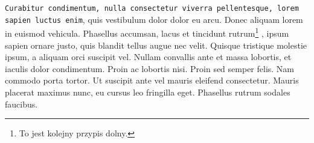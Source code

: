 \documentclass[12pt]{article}
\begin{document}
\texttt{Curabitur condimentum, nulla consectetur viverra pellentesque,
lorem sapien luctus enim}, quis vestibulum dolor dolor eu arcu. Donec
aliquam lorem in euismod vehicula. Phasellus accumsan, lacus et tincidunt
rutrum\footnote{To jest kolejny przypis dolny.}
, ipsum sapien ornare justo, quis blandit tellus augue nec velit. Quisque tristique molestie ipsum, a aliquam orci suscipit vel. Nullam convallis
ante et massa lobortis, et iaculis dolor condimentum. Proin ac lobortis nisi. Proin sed semper felis. Nam commodo porta tortor. Ut suscipit ante vel
mauris eleifend consectetur. Mauris placerat maximus nunc, eu cursus leo
fringilla eget. Phasellus rutrum sodales faucibus.
\end{document}
